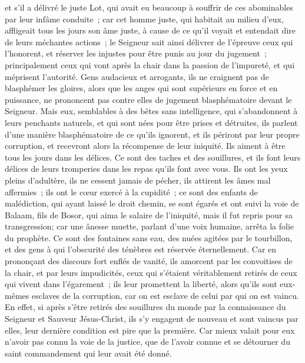 \begin{multicols}{2}
et s'il a délivré le juste Lot, qui avait eu beaucoup à souffrir de ces abominables par leur infâme conduite~;
car cet homme juste, qui habitait au milieu d'eux, affligeait tous les jours son âme juste, à cause de ce qu'il voyait et entendait dire de leurs méchantes actions~;
le Seigneur sait ainsi délivrer de l'épreuve ceux qui l'honorent, et réserver les injustes pour être punis au jour du jugement~;
principalement ceux qui vont après la chair dans la passion de l'impureté, et qui méprisent l'autorité. Gens audacieux et arrogants, ils ne craignent pas de blasphémer les gloires,
alors que les anges qui sont supérieurs en force et en puissance, ne prononcent pas contre elles de jugement blasphématoire devant le Seigneur.
Mais eux, semblables à des bêtes sans intelligence, qui s'abandonnent à leurs penchants naturels, et qui sont nées pour être prises et détruites, ils parlent d'une manière blasphématoire de ce qu'ils ignorent, et ils périront par leur propre corruption,
et recevront alors la récompense de leur iniquité. Ils aiment à être tous les jours dans les délices. Ce sont des taches et des souillures, et ils font leurs délices de leurs tromperies dans les repas qu'ils font avec vous.
Ils ont les yeux pleins d'adultère, ils ne cessent jamais de pécher, ils attirent les âmes mal affermies~; ils ont le cœur exercé à la cupidité~; ce sont des enfants de malédiction,
qui ayant laissé le droit chemin, se sont égarés et ont suivi la voie de Balaam, fils de Bosor, qui aima le salaire de l'iniquité, mais il fut repris pour sa transgression;
car une ânesse muette, parlant d'une voix humaine, arrêta la folie du prophète.
Ce sont des fontaines sans eau, des nuées agitées par le tourbillon, et des gens à qui l'obscurité des ténèbres est réservée éternellement.
Car en prononçant des discours fort enflés de vanité, ils amorcent par les convoitises de la chair, et par leurs impudicités, ceux qui s'étaient véritablement retirés de ceux qui vivent dans l'égarement~;
ils leur promettent la liberté, alors qu'ils sont eux-mêmes esclaves de la corruption, car on est esclave de celui par qui on est vaincu.
En effet, si après s'être retirés des souillures du monde par la connaissance du Seigneur et Sauveur Jésus-Christ, ils s'y engagent de nouveau et sont vaincus par elles, leur dernière condition est pire que la première.
Car mieux valait pour eux n'avoir pas connu la voie de la justice, que de l'avoir connue et se détourner du saint commandement qui leur avait été donné.

\end{multicols}
